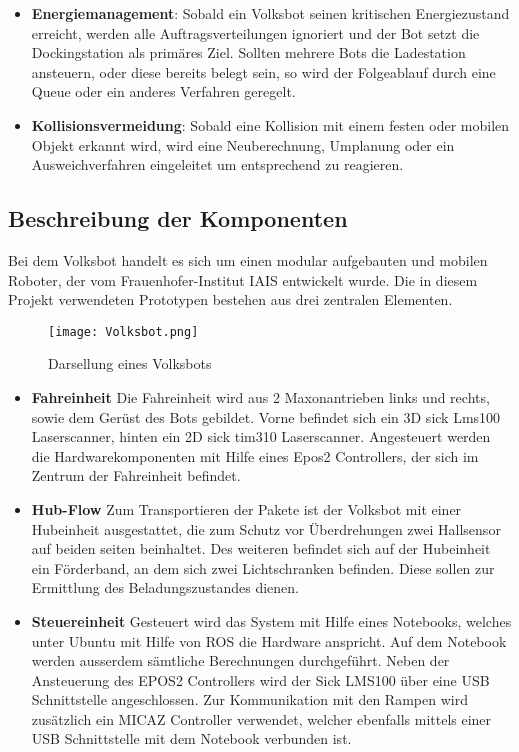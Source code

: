 \begin{itemize}
\item \textbf{Energiemanagement}: Sobald ein Volksbot seinen kritischen Energiezustand erreicht, werden alle Auftragsverteilungen ignoriert und der Bot setzt die Dockingstation als primäres Ziel. Sollten mehrere Bots die Ladestation ansteuern, oder diese bereits belegt sein, so wird der Folgeablauf durch eine Queue oder ein anderes Verfahren geregelt.

\item \textbf{Kollisionsvermeidung}: Sobald eine Kollision mit einem festen oder mobilen Objekt erkannt wird, wird eine Neuberechnung, Umplanung oder ein Ausweichverfahren eingeleitet um entsprechend zu reagieren.

\end{itemize}



\subsection{Beschreibung der Komponenten}

Bei dem Volksbot handelt es sich um einen modular aufgebauten und mobilen Roboter, der vom Frauenhofer-Institut IAIS entwickelt wurde. Die in diesem Projekt verwendeten Prototypen bestehen aus drei zentralen Elementen. 

	\begin{figure}[h!]
		\centering
			\texttt{[image: Volksbot.png]}
			\caption{Darsellung eines Volksbots}
			\label{Volksbot}
	\end{figure}	

\begin{itemize}

\item \textbf{Fahreinheit}
Die Fahreinheit wird aus 2 Maxonantrieben links und rechts, sowie dem Gerüst des Bots gebildet. Vorne befindet sich ein 3D sick Lms100 Laserscanner,  hinten ein 2D sick tim310 Laserscanner. Angesteuert werden die Hardwarekomponenten mit Hilfe eines Epos2 Controllers, der sich im Zentrum der Fahreinheit befindet. 

\item \textbf{Hub-Flow}
Zum Transportieren der Pakete ist der Volksbot mit einer Hubeinheit ausgestattet, die zum Schutz vor Überdrehungen zwei Hallsensor auf beiden seiten beinhaltet. Des weiteren befindet sich auf der Hubeinheit ein Förderband, an dem sich zwei Lichtschranken befinden. Diese sollen zur Ermittlung des Beladungszustandes dienen. 

\item \textbf{Steuereinheit}
Gesteuert wird das System mit Hilfe eines Notebooks, welches unter Ubuntu mit Hilfe von ROS die Hardware anspricht. Auf dem Notebook werden ausserdem sämtliche 
Berechnungen durchgeführt. Neben der Ansteuerung des EPOS2 Controllers wird der Sick LMS100 über eine USB Schnittstelle angeschlossen. Zur Kommunikation mit den Rampen wird zusätzlich ein MICAZ Controller verwendet, welcher ebenfalls mittels einer USB Schnittstelle mit dem Notebook verbunden ist.

\end{itemize}
